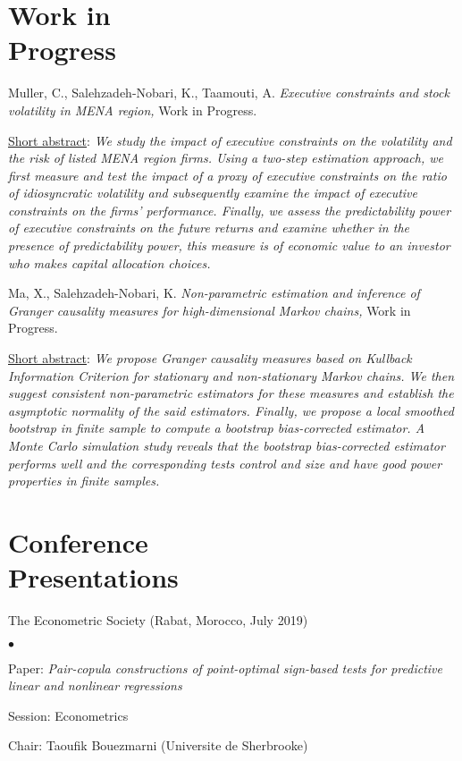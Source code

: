 \documentclass[margin,line,pifont,palatino,courier]{res}
\newenvironment{list2}{
  \begin{list}{$\bullet$}{%
      \setlength{\itemsep}{0in}
      \setlength{\parsep}{0in} \setlength{\parskip}{0in}
      \setlength{\topsep}{0in} \setlength{\partopsep}{0in}
      \setlength{\leftmargin}{0.2in}}}{\end{list}}
\begin{document}
\begin{resume}
\section{\sc \bf Work in\\
Progress}

Muller, C., Salehzadeh-Nobari, K., Taamouti, A. \emph{Executive constraints and stock volatility in MENA region,} Work in Progress.

\underline{Short abstract}: \emph{We study the impact of executive constraints on the volatility and the risk of listed MENA region firms. Using a two-step estimation approach, we first measure and test the impact of a proxy of executive constraints on the ratio of idiosyncratic volatility and subsequently examine the impact of executive constraints on the firms' performance. Finally, we assess the predictability power of executive constraints on the future returns and examine whether in the presence of predictability power, this measure is of economic value to an investor who makes capital allocation choices.}

\vspace{+4ex}
Ma, X., Salehzadeh-Nobari, K. \emph{Non-parametric estimation and inference of Granger causality measures for high-dimensional Markov chains,} Work in Progress.

\underline{Short abstract}: \emph{We propose Granger causality measures based on Kullback Information Criterion for stationary and non-stationary Markov chains. We then suggest consistent non-parametric estimators for these measures and establish the asymptotic normality of the said estimators. Finally, we propose a local smoothed bootstrap in finite sample to compute a bootstrap bias-corrected estimator. A Monte Carlo simulation study reveals that the bootstrap bias-corrected estimator performs well and the corresponding tests control and size and have good power properties in finite samples.}

\hrulefill

\section{\sc \textbf{Conference \\ Presentations}}

The Econometric Society (Rabat, Morocco, July 2019)\\
\begin{list2}
\item Paper: \emph{Pair-copula constructions of point-optimal sign-based tests for predictive linear and nonlinear regressions}
\item Session: Econometrics
\item Chair: Taoufik Bouezmarni (Universite de Sherbrooke)
\end{list2} 


\end{resume}
\end{document}
